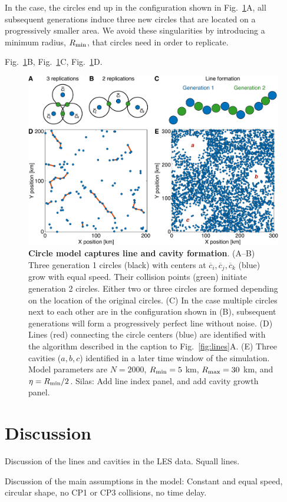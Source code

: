 \documentclass[reprint,amsmath,amssymb]{revtex4-1}
\begin{document}
In the case, the circles end up in the configuration shown in Fig.~\ref{fig:model}A, all subsequent generations induce three new circles that are located on a progressively smaller area. We avoid these singularities by introducing a minimum radius, $R_{\textnormal{min}}$, that circles need in order to replicate.

Fig.~\ref{fig:model}B, Fig.~\ref{fig:model}C, Fig.~\ref{fig:model}D.

\begin{figure}
\centering
\includegraphics[height=0.5\linewidth]{model}
\caption{{\bf Circle model captures line and cavity formation}. (A--B) Three generation 1 circles (black) with centers at $\overline{c}_i, \overline{c}_j, \overline{c}_k$ (blue) grow with equal speed. Their collision points (green) initiate generation 2 circles. Either two or three circles are formed depending on the location of the original circles. (C) In the case multiple circles next to each other are in the configuration shown in (B), subsequent generations will form a progressively perfect line without noise. (D) Lines (red) connecting the circle centers (blue) are identified with the algorithm described in the caption to Fig.~\ref{fig:lines}A. (E) Three cavities ($a,b,c$) identified in a later time window of the simulation. Model parameters are $N=2000$, $R_{\textnormal{min}}=5$ km, $R_{\textnormal{max}}=30$ km, and $\eta=R_{\textnormal{min}}/2$. {\color{red} Silas: Add line index panel, and add cavity growth panel.}}
\label{fig:model}
\end{figure}

\section{Discussion}
Discussion of the lines and cavities in the LES data. Squall lines.

Discussion of the main assumptions in the model: Constant and equal speed, circular shape, no CP1 or CP3 collisions, no time delay.
\end{document}
